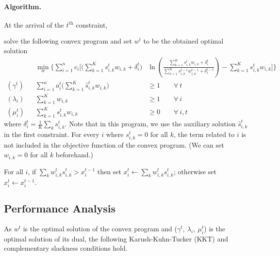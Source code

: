 \clearpage

\paragraph{Algorithm.}

At the arrival of the $t^{\text{th}}$ constraint,
\begin{compactenum}
	\item solve the following convex program and set $w^t$ to be the obtained optimal solution
%
\begin{align*}
&& \min_{w} \biggl\{\sum_{i=1}^{n} c_{i}  \biggl[  \biggl(\sum_{k=1}^{K} s_{i,k}^{t} w_{i,k}  + \delta_{i}^{t} \biggr) &
					 \ln \left( \frac{\sum_{k=1}^{K} s_{i,k}^{t} w_{i,k}  + \delta_{i}^{t}}{ \sum_{k=1}^{K}  s_{i,k}^{t-1}w_{i,k}^{t-1}  + \delta_{i}^{t-1}}  \right)
					 		- \sum_{k=1}^{K}  s_{i,k}^{t} w_{i,k} \biggr] \biggr\} \\
    (\gamma^{t})  && \sum_{i=1}^{n} a_{i}^{t} \biggl( \sum_{k=1}^{K}  \hat{s}_{i,k}^{t} w_{i,k} \biggr) &\geq 1 \qquad \forall\ t\\
%
    (\lambda_{i}) && \sum_{k=1}^{K}  w_{i,k} &\geq 1 \qquad \forall\ i\\
%
    (\mu_{i}^{t}) && \sum_{k=1}^{K} s_{i,k}^{t} w_{i,k} &\geq 0 \qquad \forall\ i,t
\end{align*}
%
where $\delta_{i}^{t} = \frac{1}{K} \sum_{k} s_{i,k}^{t}$.
Note that in this program, we use the auxiliary solution $\hat{s}_{i,k}^{t}$ in the first constraint. For every $i$ where $s_{i,k}^{t} = 0$ for all $k$, the term related to $i$ is not included in the objective function of the convex program.
(We can set $w_{i,k} = 0$ for all $k$ beforehand.)
	\item For all $i$, if $\sum_{k} w_{i,k}^{t} s_{i,k}^{t} > x_{i}^{t-1}$ then set $x_{i}^{t} \gets \sum_{k} w_{i,k}^{t} s_{i,k}^{t}$;
otherwise set $x_{i}^{t} \gets x_{i}^{t-1}$.
\end{compactenum}

\medskip

\subsection{Performance Analysis}
As $w^{t}$ is the optimal solution of the convex program and ($\gamma^t,\ \lambda_{i},\ \mu_{i}^{t}$) is the optimal solution of its dual, the following Karush-Kuhn-Tucker (KKT) and complementary slackness conditions hold.

